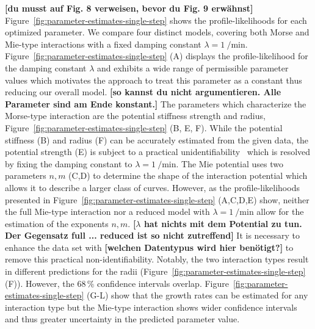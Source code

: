 \documentclass[10pt,letterpaper]{article}
\begin{document}
{\bf [du musst auf Fig. 8 verweisen, bevor du Fig. 9 erwähnst]}
Figure~\ref{fig:parameter-estimates-single-step} shows the profile-likelihoods for each optimized
parameter. We compare four distinct models, covering both Morse and Mie-type interactions with a
fixed damping
constant $\lambda=\SI{1}{\per\minute}$.
Figure~\ref{fig:parameter-estimates-single-step} (A) displays the profile-likelihood for the damping
constant $\lambda$ and exhibits a wide range of permissible parameter values which motivates the
approach to treat this parameter as a constant thus reducing our overall model.
{\bf [so kannst du nicht argumentieren. Alle Parameter sind am Ende konstant.]}
The parameters which characterize the Morse-type interaction are the potential stiffness strength
and radius, Figure~\ref{fig:parameter-estimates-single-step} (B, E, F). While the potential
stiffness (B) and radius (F) can be accurately estimated from the given data, the potential strength
(E) is subject to a practical unidentifiability~\cite{Raue2009} which is resolved by fixing the
damping constant to $\lambda=\SI{1}{\per\minute}$.
The Mie potential uses two parameters $n,m$ (C,D) to determine the shape of the interaction
potential which allows it to describe a larger class of curves.
However, as the profile-likelihoods presented in Figure~\ref{fig:parameter-estimates-single-step}
(A,C,D,E) show, neither the full Mie-type interaction nor a reduced model with
$\lambda=\SI{1}{\per\minute}$ allow for the estimation of the exponents $n,m$.
{\bf [$\lambda$ hat nichts mit dem Potential zu tun. Der Gegensatz full ... reduced ist so nicht zutreffend]}
It is necessary to enhance the data set with
{\bf [welchen Datentypus wird hier benötigt?]} to remove this practical non-identifiability.
Notably, the two interaction types result in different predictions for the radii
(Figure~\ref{fig:parameter-estimates-single-step} (F)).
However, the $68\,\%$ confidence intervals overlap.
Figure~\ref{fig:parameter-estimates-single-step} (G-L) show that the growth rates can be estimated
for any interaction type but the Mie-type interaction shows wider confidence intervals and thus
greater uncertainty in the predicted parameter value.
\end{document}
